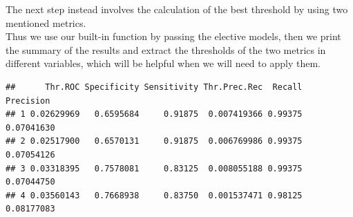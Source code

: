 \documentclass[
]{article}
\newenvironment{Shaded}{\begin{snugshade}}{\end{snugshade}}
\newcommand{\AttributeTok}[1]{\textcolor[rgb]{0.77,0.63,0.00}{#1}}
\newcommand{\CommentTok}[1]{\textcolor[rgb]{0.56,0.35,0.01}{\textit{#1}}}
\newcommand{\ConstantTok}[1]{\textcolor[rgb]{0.00,0.00,0.00}{#1}}
\newcommand{\DecValTok}[1]{\textcolor[rgb]{0.00,0.00,0.81}{#1}}
\newcommand{\FunctionTok}[1]{\textcolor[rgb]{0.00,0.00,0.00}{#1}}
\newcommand{\NormalTok}[1]{#1}
\newcommand{\OtherTok}[1]{\textcolor[rgb]{0.56,0.35,0.01}{#1}}
\newcommand{\SpecialCharTok}[1]{\textcolor[rgb]{0.00,0.00,0.00}{#1}}
\begin{document}
\begin{Shaded}
\end{Shaded}

The next step instead involves the calculation of the best threshold by
using two mentioned metrics.\\
Thus we use our built-in function by passing the elective models, then
we print the summary of the results and extract the thresholds of the
two metrics in different variables, which will be helpful when we will
need to apply them.

\begin{Shaded}
\end{Shaded}

\begin{verbatim}
##      Thr.ROC Specificity Sensitivity Thr.Prec.Rec  Recall  Precision
## 1 0.02629969   0.6595684     0.91875  0.007419366 0.99375 0.07041630
## 2 0.02517900   0.6570131     0.91875  0.006769986 0.99375 0.07054126
## 3 0.03318395   0.7578081     0.83125  0.008055188 0.99375 0.07044750
## 4 0.03560143   0.7668938     0.83750  0.001537471 0.98125 0.08177083
\end{verbatim}

\begin{Shaded}
\end{Shaded}
\end{document}
